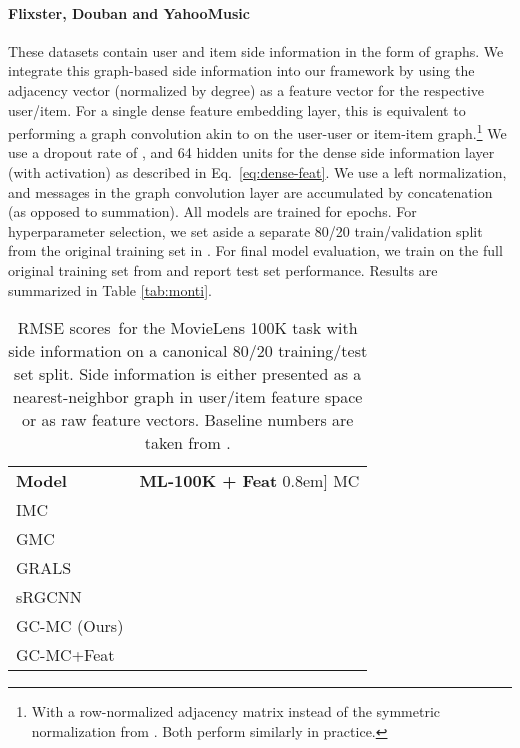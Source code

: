 \documentclass[twoside]{article}
\begin{document}
\paragraph{Flixster, Douban and YahooMusic} 
These datasets contain user and item side information in the form of graphs. We integrate this graph-based side information into our framework by using the adjacency vector (normalized by degree) as a feature vector for the respective user/item. For a single dense feature embedding layer, this is equivalent to performing a graph convolution akin to \cite{kipf2016semi} on the user-user or item-item graph.\footnote{With a row-normalized adjacency matrix instead of the symmetric normalization from \cite{kipf2016semi}. Both perform similarly in practice.} We use a dropout rate of , and 64 hidden units for the dense side information layer (with  activation) as described in Eq.~\ref{eq:dense-feat}. We use a left normalization, and messages in the graph convolution layer are accumulated by concatenation (as opposed to summation). All models are trained for  epochs. For hyperparameter selection, we set aside a separate 80/20 train/validation split from the original training set in \cite{2017_Monti_arXiv}. For final model evaluation, we train on the full original training set from \cite{2017_Monti_arXiv} and report test set performance. Results are summarized in Table \ref{tab:monti}.

\begin{table}[ht]
\centering
\begin{tabular}{l r}
\toprule
\textbf{Model} & \textbf{ML-100K + Feat} 
\-0.8em]
MC \cite{candes2012exact} &  \\
IMC \cite{jain2013provable, xu2013speedup}&  \\
GMC \cite{kalofolias2014matrix} &  \\
GRALS \cite{GralsRaoNIPS2015} & \\
sRGCNN \cite{2017_Monti_arXiv} & \\
GC-MC (Ours) &  \\
GC-MC+Feat &  \\
\bottomrule
\end{tabular}
\caption{RMSE scores\protect\footnotemark\, for the MovieLens 100K task with side information on a canonical 80/20 training/test set split. Side information is either presented as a nearest-neighbor graph in user/item feature space or as raw feature  vectors. Baseline numbers are taken from \cite{2017_Monti_arXiv}.}\label{tab:ml_100k_scores}
\end{table}
\end{document}
